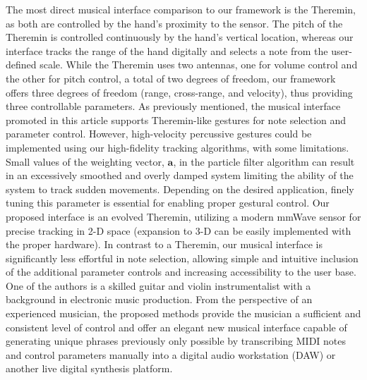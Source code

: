 \documentclass[10pt,journal,final]{IEEEtran}
\begin{document}
The most direct musical interface comparison to our framework is the Theremin, as both are controlled by the hand's proximity to the sensor. 
The pitch of the Theremin is controlled continuously by the hand's vertical location, whereas our interface tracks the range of the hand digitally and selects a note from the user-defined scale. 
While the Theremin uses two antennas, one for volume control and the other for pitch control, a total of two degrees of freedom, our framework offers three degrees of freedom (range, cross-range, and velocity), thus providing three controllable parameters.
As previously mentioned, the musical interface promoted in this article supports Theremin-like gestures for note selection and parameter control.
However, high-velocity percussive gestures could be implemented using our high-fidelity tracking algorithms, with some limitations.
Small values of the weighting vector, $\mathbf{a}$, in the particle filter algorithm can result in an excessively smoothed and overly damped system limiting the ability of the system to track sudden movements. 
Depending on the desired application, finely tuning this parameter is essential for enabling proper gestural control.
Our proposed interface is an evolved Theremin, utilizing a modern mmWave sensor for precise tracking in 2-D space (expansion to 3-D can be easily implemented with the proper hardware). %
In contrast to a Theremin, our musical interface is significantly less effortful in note selection, allowing simple and intuitive inclusion of the additional parameter controls and increasing accessibility to the user base.
One of the authors is a skilled guitar and violin instrumentalist with a background in electronic music production.
From the perspective of an experienced musician, the proposed methods provide the musician a sufficient and consistent level of control and offer an elegant new musical interface capable of generating unique phrases previously only possible by transcribing MIDI notes and control parameters manually into a digital audio workstation (DAW) or another live digital synthesis platform. 
\end{document}
